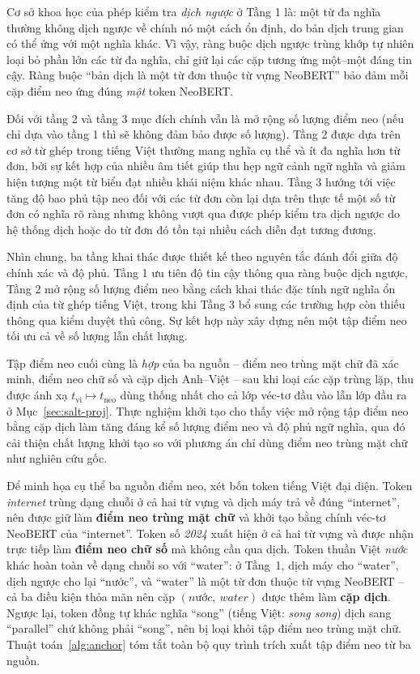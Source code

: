 Cơ sở khoa học của phép kiểm tra \textit{dịch ngược} ở Tầng 1 là: một từ đa nghĩa thường không
dịch ngược về chính nó một cách ổn định, do bản dịch trung gian có thể ứng với một nghĩa khác.
Vì vậy, ràng buộc dịch ngược trùng khớp tự nhiên loại bỏ phần lớn các từ đa nghĩa, chỉ giữ lại
các cặp tương ứng một--một đáng tin cậy. Ràng buộc ``bản dịch là một từ đơn thuộc từ vựng
NeoBERT'' bảo đảm mỗi cặp điểm neo ứng đúng \textit{một} token NeoBERT.

Đối với tầng 2 và tầng 3 mục đích chính vẫn là mở rộng số lượng điểm neo (nếu chỉ dựa vào tầng 1 thì sẽ không đảm bảo được số lượng).
Tầng 2 được dựa trên cơ sở từ ghép trong tiếng Việt thường mang nghĩa cụ thể và ít đa nghĩa hơn từ đơn, bởi sự kết hợp của nhiều âm tiết giúp 
thu hẹp ngữ cảnh ngữ nghĩa và giảm hiện tượng một từ biểu đạt nhiều khái niệm khác nhau. Tầng 3 hướng tới việc tăng độ bao phủ tập neo đối với 
các từ đơn còn lại dựa trên thực tế một số từ đơn có nghĩa rõ ràng nhưng không vượt qua được phép kiểm tra dịch ngược do hệ thống dịch hoặc do
từ đơn đó tồn tại nhiều cách diễn đạt tương đương. 

Nhìn chung, ba tầng khai thác được thiết kế theo nguyên tắc đánh đổi giữa độ chính xác và độ phủ. 
Tầng 1 ưu tiên độ tin cậy thông qua ràng buộc dịch ngược, Tầng 2 mở rộng số lượng điểm neo bằng cách khai thác đặc tính ngữ nghĩa ổn định của từ ghép tiếng Việt, 
trong khi Tầng 3 bổ sung các trường hợp còn thiếu thông qua kiểm duyệt thủ công. Sự kết hợp này xây dựng nên một tập điểm neo 
tối ưu cả về số lượng lẫn chất lượng.

Tập điểm neo cuối cùng là \textit{hợp} của ba nguồn -- điểm neo trùng mặt chữ đã xác minh, điểm neo chữ số và cặp dịch Anh--Việt
-- sau khi loại các cặp trùng lặp, thu được ánh xạ $t_{\mathrm{vi}} \mapsto
t_{\mathrm{neo}}$ dùng thống nhất cho cả lớp véc-tơ đầu vào lẫn lớp đầu ra ở
Mục~\ref{sec:salt-proj}. Thực nghiệm khởi tạo cho thấy việc mở rộng tập điểm neo bằng cặp dịch làm
tăng đáng kể số lượng điểm neo và độ phủ ngữ nghĩa, qua đó cải thiện chất lượng khởi tạo so với
phương án chỉ dùng điểm neo trùng mặt chữ như nghiên cứu gốc.

Để minh họa cụ thể ba nguồn điểm neo, xét bốn token tiếng Việt đại diện. Token \textit{internet}
trùng dạng chuỗi ở cả hai từ vựng và dịch máy trả về đúng ``internet'', nên được giữ làm
\textbf{điểm neo trùng mặt chữ} và khởi tạo bằng chính véc-tơ NeoBERT của ``internet''. Token số
\textit{2024} xuất hiện ở cả hai từ vựng và được nhận trực tiếp làm \textbf{điểm neo chữ số} mà không
cần qua dịch. Token thuần Việt \textit{nước} khác hoàn toàn về dạng chuỗi so với ``water'': ở Tầng~1,
dịch máy cho ``water'', dịch ngược cho lại ``nước'', và ``water'' là một từ đơn thuộc từ
vựng NeoBERT -- cả ba điều kiện thỏa mãn nên cặp $(\textit{nước},\ \textit{water})$ được thêm
làm \textbf{cặp dịch}. Ngược lại, token đồng tự khác nghĩa ``song'' (tiếng Việt: \textit{song
song}) dịch sang ``parallel'' chứ không phải ``song'', nên bị loại khỏi tập điểm neo trùng mặt chữ.
Thuật toán~\ref{alg:anchor} tóm tắt toàn bộ quy trình trích xuất tập điểm neo từ ba nguồn.

